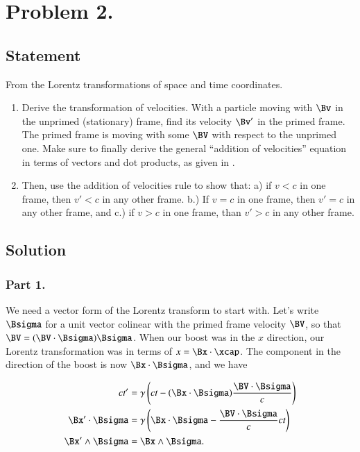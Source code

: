 \section{Problem 2.}
\subsection{Statement}

From the Lorentz transformations of space and time coordinates.

\begin{enumerate}
\item Derive the transformation of velocities.  With a particle moving with $\Bv$ in the unprimed (stationary) frame, find its velocity $\Bv'$ in the primed frame.  The primed frame is moving with some $\BV$ with respect to the unprimed one.  Make sure to finally derive the general ``addition of velocities'' equation in terms of vectors and dot products, as given in \cite{landau1971classical}.
\item Then, use the addition of velocities rule to show that: a) if $v < c$ in one frame, then $v' < c$ in any other frame.  b.) If $v = c$ in one frame, then $v' = c$ in any other frame, and c.) if $v> c$ in one frame, than $v' > c$ in any other frame.
\end{enumerate}

\subsection{Solution}
\subsubsection{Part 1.}

We need a vector form of the Lorentz transform to start with.  Let's write $\Bsigma$ for a unit vector colinear with the primed frame velocity $\BV$, so that $\BV = (\BV \cdot \Bsigma) \Bsigma$.  When our boost was in the $x$ direction, our Lorentz transformation was in terms of $x = \Bx \cdot \xcap$.  The component in the direction of the boost is now $\Bx \cdot \Bsigma$, and we have

\begin{subequations}
\begin{align}\label{eqn:relativisticElectrodynamicsA1:200}
c t' &= \gamma \left( ct - (\Bx \cdot \Bsigma) \frac{\BV \cdot \Bsigma}{c} \right) \\
\Bx' \cdot \Bsigma &= \gamma \left( \Bx \cdot \Bsigma - \frac{\BV \cdot \Bsigma}{c} c t \right) \\
\Bx' \wedge \Bsigma &= \Bx \wedge \Bsigma .
\end{align}
\end{subequations}

